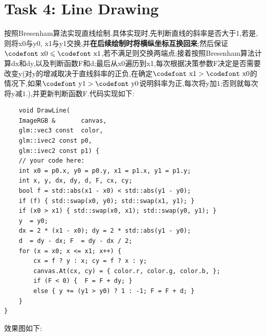 \documentclass{ctexart}
\begin{document}
\section*{Task 4: Line Drawing}
按照Bresenham算法实现直线绘制.具体实现时,先判断直线的斜率是否大于1,若是,则将{\codefont x0}与{\codefont y0}, {\codefont x1}与{\codefont y1}交换,并\textbf{在后续绘制时将横纵坐标互换回来};然后保证$\text{\codefont x0}\leqslant\text{\codefont x1}$,若不满足则交换两端点;接着按照Bresenham算法计算{\codefont dx}和{\codefont dy},以及判断函数{\codefont F}和{\codefont d};最后从{\codefont x0}遍历到{\codefont x1},每次根据决策参数{\codefont F}决定是否需要改变{\codefont y}(对{\codefont y}的增减取决于直线斜率的正负,在确定$\text{\codefont x1}>\text{\codefont x0}$的情况下,如果$\text{\codefont y1}>\text{\codefont y0}$说明斜率为正,每次将{\codefont y}加$1$;否则就每次将{\codefont y}减$1$.),并更新判断函数{\codefont F}.代码实现如下:
\begin{lstlisting}
    void DrawLine(
    ImageRGB &       canvas,
    glm::vec3 const  color,
    glm::ivec2 const p0,
    glm::ivec2 const p1) {
    // your code here:
    int x0 = p0.x, y0 = p0.y, x1 = p1.x, y1 = p1.y;
    int x, y, dx, dy, d, F, cx, cy;
    bool f = std::abs(x1 - x0) < std::abs(y1 - y0);
    if (f) { std::swap(x0, y0); std::swap(x1, y1); }
    if (x0 > x1) { std::swap(x0, x1); std::swap(y0, y1); }
    y  = y0; 
    dx = 2 * (x1 - x0); dy = 2 * std::abs(y1 - y0);
    d  = dy - dx; F  = dy - dx / 2;
    for (x = x0; x <= x1; x++) {
        cx = f ? y : x; cy = f ? x : y;
        canvas.At(cx, cy) = { color.r, color.g, color.b, };
        if (F < 0) {  F = F + dy; } 
        else { y += (y1 > y0) ? 1 : -1; F = F + d; }
    }
}
\end{lstlisting}
效果图如下:
\end{document}
